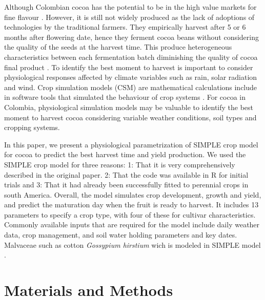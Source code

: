 \documentclass[gene,journal,article,submit,moreauthors,pdftex]{Definitions/mdpi}
\begin{document}
Although Colombian cocoa has the potential to be in the high value markets for fine flavour \citep{Escobar2020}. However, it is still not widely produced as the lack of adoptions of technologies by the traditional farmers. They empirically harvest after 5 or 6 months after flowering date, hence they ferment cocoa beans without considering the  quality of the seeds at the harvest time. This produce heterogeneous characteristics between each fermentation batch diminishing the quality of cocoa final product \citep{Escobar2021}. To identify the best moment to harvest is important to consider physiological responses affected by climate variables such as rain, solar radiation and wind.   Crop simulation models (CSM) are mathematical calculations include in software tools that simulated the behaviour of crop systems \citep{Oteng-Darko2013}. For cocoa in Colombia, physiological simulation models may be valuable to identify the best moment to harvest cocoa considering variable weather conditions, soil types and cropping systems. 
  
In this paper, we present a physiological parametrization of SIMPLE crop model for cocoa to predict the best harvest time  and yield production. We used the SIMPLE crop model \citep{Zao2019simple} for three reasons: 1: That it is very comprehensively described in the original paper. 2: That the code was available in R for initial trials and 3: That it had already been successfully fitted to perennial crops in south America. Overall, the model simulates crop development, growth and yield, and predict the maturation day when the fruit is ready to harvest. It includes 13 parameters to specify a crop type, with four of these for cultivar characteristics. Commonly available inputs that are required for the model include daily weather data, crop management, and soil water holding parameters and key dates. Malvaceae such as cotton \textit{ Gossypium hirstium} \citep{Nix2017cotton} wich is modeled in SIMPLE model \citep{Zao2019simple}. 
 
 
\section{Materials and Methods}
\end{document}

